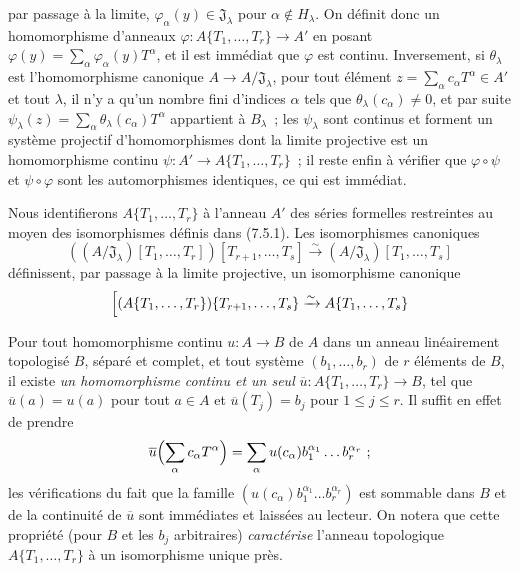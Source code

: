 \begin{env}[7.5.1]
par passage à la limite, $\varphi_\alpha(y)\in\mathfrak J_\lambda$ pour
$\alpha\notin H_\lambda$. On définit donc un homomorphisme d'anneaux
$\varphi:A\{T_1,\ldots,T_r\}\to A'$ en posant
$\varphi(y)=\sum_\alpha\varphi_\alpha(y)T^\alpha$, et il est immédiat que
$\varphi$ est continu. Inversement, si $\theta_\lambda$ est l'homomorphisme
canonique $A\to A/\mathfrak J_\lambda$, pour tout élément
$z=\sum_\alpha c_\alpha T^\alpha\in A'$ et tout $\lambda$, il n'y a qu'un
nombre fini d'indices $\alpha$ tels que $\theta_\lambda(c_\alpha)\neq0$, et
par suite
$\psi_\lambda(z)=\sum_\alpha\theta_\lambda(c_\alpha)T^\alpha$ appartient à
$B_\lambda$~; les $\psi_\lambda$ sont continus et forment un système
projectif d'homomorphismes dont la limite projective est un homomorphisme
continu $\psi:A'\to A\{T_1,\ldots,T_r\}$~; il reste enfin à vérifier que
$\varphi\circ\psi$ et $\psi\circ\varphi$ sont les automorphismes identiques,
ce qui est immédiat.
\end{env}

\begin{env}[7.5.2]
\label{0.7.5.2-fr}
Nous identifierons $A\{T_1,\ldots,T_r\}$ à l'anneau $A'$ des séries formelles
restreintes au moyen des isomorphismes définis dans (7.5.1). Les isomorphismes
canoniques
\[
  ((A/\mathfrak J_\lambda)[T_1,\ldots,T_r])
  [T_{r+1},\ldots,T_s]
  \xrightarrow{\sim}
  (A/\mathfrak J_\lambda)[T_1,\ldots,T_s]
\]
définissent, par passage à la limite projective, un isomorphisme canonique
\[
  \Bigl[(A\{T_1,\ldots,T_r\})\{T_{r+1},\ldots,T_s\}
  \xrightarrow{\sim}
  A\{T_1,\ldots,T_s\}
\]
\end{env}

\begin{env}[7.5.3]
\label{0.7.5.3-fr}
Pour tout homomorphisme continu $u:A\to B$ de $A$ dans un anneau linéairement
topologisé $B$, séparé et complet, et tout système $(b_1,\ldots,b_r)$ de $r$
éléments de $B$, il existe \emph{un homomorphisme continu et un seul}
$\overline u:A\{T_1,\ldots,T_r\}\to B$, tel que $\overline u(a)=u(a)$ pour
tout $a\in A$ et $\overline u(T_j)=b_j$ pour $1\leq j\leq r$. Il suffit en
effet de prendre
\[
  \overline u\Bigl(\sum_\alpha c_\alpha T^\alpha\Bigr)
  =\sum_\alpha u(c_\alpha)b_1^{\alpha_1}\ldots b_r^{\alpha_r}~;
\]
les vérifications du fait que la famille
$(u(c_\alpha)b_1^{\alpha_1}\ldots b_r^{\alpha_r})$ est sommable dans $B$ et
de la continuité de $\overline u$ sont immédiates et laissées au lecteur. On
notera que cette propriété (pour $B$ et les $b_j$ arbitraires)
\emph{caractérise} l'anneau topologique $A\{T_1,\ldots,T_r\}$ à un
isomorphisme unique près.
\end{env}

